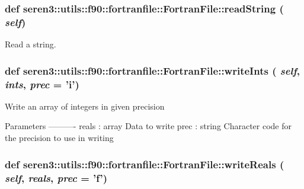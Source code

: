  \hypertarget{classseren3_1_1utils_1_1f90_1_1fortranfile_1_1FortranFile_a7746939efaf7d5c6029e9078b460bb14}{
\subsubsection[{readString}]{\setlength{\rightskip}{0pt plus 5cm}def seren3::utils::f90::fortranfile::FortranFile::readString ( {\em self})}}
\label{classseren3_1_1utils_1_1f90_1_1fortranfile_1_1FortranFile_a7746939efaf7d5c6029e9078b460bb14}
\begin{DoxyVerb}Read a string.\end{DoxyVerb}
 \hypertarget{classseren3_1_1utils_1_1f90_1_1fortranfile_1_1FortranFile_adc3a94cca262765578a17b9a3ae398f2}{
\subsubsection[{writeInts}]{\setlength{\rightskip}{0pt plus 5cm}def seren3::utils::f90::fortranfile::FortranFile::writeInts ( {\em self}, \/   {\em ints}, \/   {\em prec} = {\ttfamily 'i'})}}
\label{classseren3_1_1utils_1_1f90_1_1fortranfile_1_1FortranFile_adc3a94cca262765578a17b9a3ae398f2}
\begin{DoxyVerb}Write an array of integers in given precision

Parameters
----------
reals : array
    Data to write
prec : string
    Character code for the precision to use in writing
\end{DoxyVerb}
 \hypertarget{classseren3_1_1utils_1_1f90_1_1fortranfile_1_1FortranFile_a97118a86f5a056d556e376e349695a59}{
\subsubsection[{writeReals}]{\setlength{\rightskip}{0pt plus 5cm}def seren3::utils::f90::fortranfile::FortranFile::writeReals ( {\em self}, \/   {\em reals}, \/   {\em prec} = {\ttfamily 'f'})}}
